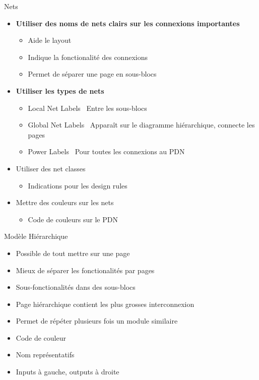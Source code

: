 \begin{frame}{Nets}
    \begin{itemize}
        \item \textbf{Utiliser des noms de nets clairs sur les connexions importantes}
        \begin{itemize}
            \item Aide le layout
            \item Indique la fonctionalité des connexions
            \item Permet de séparer une page en sous-blocs
        \end{itemize}
        \bigskip
        \item \textbf{Utiliser les types de nets}
        \begin{itemize}
            \item Local Net Labels \faLongArrowAltRight~Entre les sous-blocs
            \item Global Net Labels \faLongArrowAltRight~Apparaît sur le diagramme hiérarchique, connecte les pages
            \item Power Labels \faLongArrowAltRight~Pour toutes les connexions au PDN
        \end{itemize}
        \bigskip
        \item Utiliser des net classes
        \begin{itemize}
            \item Indications pour les design rules
        \end{itemize}
        \item Mettre des couleurs sur les nets
        \begin{itemize}
            \item Code de couleurs sur le PDN
        \end{itemize}
    \end{itemize}
\end{frame}

\begin{frame}{Modèle Hiérarchique}
    \begin{twocolumns}
        \leftcol
        \begin{itemize}
            \item Possible de tout mettre sur une page
            \item Mieux de séparer les fonctionalités par pages
            \item Sous-fonctionalités dans des sous-blocs
            \bigskip
            \item Page hiérarchique contient les plus grosses interconnexion
            \item Permet de répéter plusieurs fois un module similaire
            \bigskip
            \item Code de couleur
            \item Nom représentatifs
            \item Inputs à gauche, outputs à droite
        \end{itemize}

        \rightcol
    \end{twocolumns}
\end{frame}


